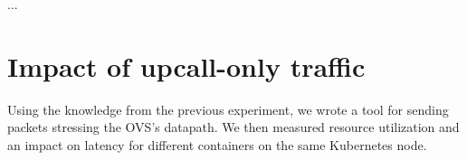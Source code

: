 ...

\section{Impact of upcall-only traffic}
\label{design:upcall-impact}


Using the knowledge from the previous experiment, we wrote a tool for sending packets stressing the OVS's datapath. We then measured resource utilization and an impact on latency for different containers on the same Kubernetes node.
